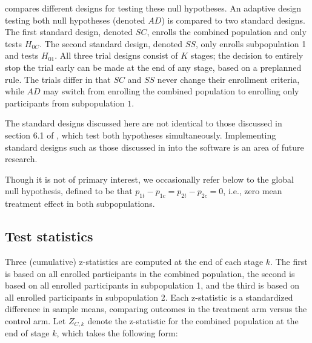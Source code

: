\documentclass[article]{jss}
\begin{document}
 compares different designs for testing these null hypotheses. 
An adaptive design testing both null hypotheses (denoted $AD$) is compared to two standard designs. The first standard design, denoted $SC$, enrolls the combined population and only tests $H_{0C}$. The second standard design, denoted $SS$, only enrolls subpopulation 1 and tests $H_{01}$.
All three trial designs consist of $K$ stages; the decision to entirely stop the trial early can be made at the end of any stage, based on a preplanned rule. The trials differ in that $SC$ and $SS$ never change their enrollment criteria, while $AD$ may switch from enrolling the combined population  to enrolling only participants from subpopulation $1$.

The standard designs discussed here are not identical to those discussed in section 6.1 of \citep{Rosenblum2013AdaptMISTIE}, which test both hypotheses simultaneously. Implementing standard designs such as those discussed in \citep{Rosenblum2013AdaptMISTIE} into the  software is an area of future research.

Though it is not of primary interest, we occasionally refer below to the global null hypothesis, defined  to be that $p_{1t}-p_{1c}=p_{2t}-p_{2c}=0$, i.e., zero mean treatment effect in both subpopulations.




\subsection{Test statistics}
\label{sub:testStats}
Three (cumulative) z-statistics are computed at the end of each stage $k$. The first is based on all enrolled participants in the combined population, the second is based on all enrolled participants in subpopulation 1, and the third is based on all enrolled participants in subpopulation 2.  Each z-statistic is a standardized difference in sample means, comparing outcomes in the treatment arm versus the control arm.
Let $Z_{C,k}$ denote the z-statistic for the combined population at the end of stage $k$, which  takes the following form:
\end{document}
